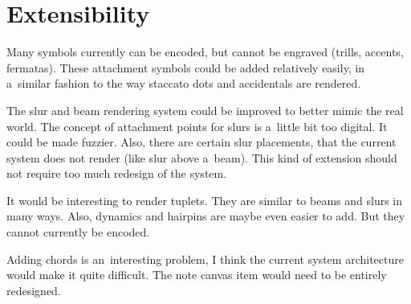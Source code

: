\section{Extensibility}

Many symbols currently can be encoded, but cannot be engraved (trills, accents, fermatas). These attachment symbols could be added relatively easily, in a~similar fashion to the way staccato dots and accidentals are rendered.

The slur and beam rendering system could be improved to better mimic the real world. The concept of attachment points for slurs is a~little bit too digital. It could be made fuzzier. Also, there are certain slur placements, that the current system does not render (like slur above a~beam). This kind of extension should not require too much redesign of the system.

It would be interesting to render tuplets. They are similar to beams and slurs in many ways. Also, dynamics and hairpins are maybe even easier to add. But they cannot currently be encoded.

Adding chords is an~interesting problem, I think the current system architecture would make it quite difficult. The note canvas item would need to be entirely redesigned.
